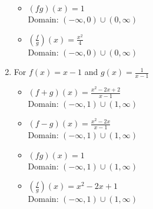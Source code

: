 \begin{enumerate}
\begin{multicols}{2}
\begin{itemize}

\item $(fg)(x) = 1$ \\
      Domain: $(-\infty,0) \cup (0, \infty)$
      
      \vfill
      
      \columnbreak
      
\item $\left(\frac{f}{g}\right)(x) = \frac{x^2}{4}$ \\
      Domain: $(-\infty,0) \cup (0, \infty)$


\end{itemize}

\end{multicols}

\newpage

\item For   $f(x) =x-1$ and $g(x) = \frac{1}{x-1}$

\begin{multicols}{2}

\begin{itemize}

\item $(f+g)(x) = \frac{x^2-2x+2}{x-1}$ \\
      Domain: $(-\infty, 1) \cup (1, \infty)$
      
      \vfill
      
      \columnbreak
      
\item $(f-g)(x) = \frac{x^2-2x}{x-1}$ \\
      Domain:  $(-\infty,1) \cup (1, \infty)$


\end{itemize}

\end{multicols}

\begin{multicols}{2}

\begin{itemize}

\item $(fg)(x) = 1$ \\
      Domain: $(-\infty,1) \cup (1, \infty)$
      
      \vfill
      
      \columnbreak
      
\item $\left(\frac{f}{g}\right)(x) =x^2-2x+1$ \\
      Domain: $(-\infty,1) \cup (1, \infty)$



\end{itemize}
\end{multicols}
\end{enumerate}
